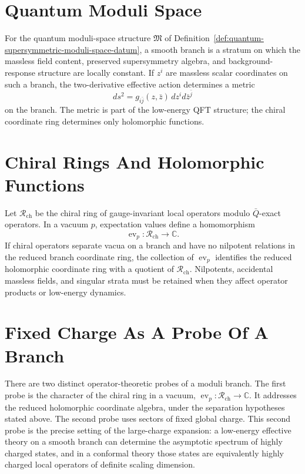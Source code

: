 \section{Quantum Moduli Space}

For the quantum moduli-space structure
\(\mathfrak M\) of
Definition~\ref{def:quantum-supersymmetric-moduli-space-datum}, a smooth
branch is a stratum on which the massless field content, preserved
supersymmetry algebra, and background-response structure are locally constant.
If \(z^i\) are massless scalar coordinates on such a branch, the
two-derivative effective action determines a metric
\[
  ds^2=g_{i\bar j}(z,\bar z)\,dz^i d\bar z^{\bar j}
\]
on the branch.  The metric is part of the low-energy QFT structure; the chiral
coordinate ring determines only holomorphic functions.

\section{Chiral Rings And Holomorphic Functions}

Let \(\mathcal R_{\mathrm{ch}}\) be the chiral ring of gauge-invariant local
operators modulo \(\bar Q\)-exact operators.  In a vacuum \(p\), expectation
values define a homomorphism
\[
  \operatorname{ev}_p:\mathcal R_{\mathrm{ch}}\longrightarrow\mathbb C .
\]
If chiral operators separate vacua on a branch and have no nilpotent
relations in the reduced branch coordinate ring, the collection of
\(\operatorname{ev}_p\) identifies the reduced holomorphic coordinate ring
with a quotient of \(\mathcal R_{\mathrm{ch}}\).  Nilpotents, accidental
massless fields, and singular strata must be retained when they affect
operator products or low-energy dynamics.

\section{Fixed Charge As A Probe Of A Branch}

There are two distinct operator-theoretic probes of a moduli branch.  The
first probe is the character of the chiral ring in a vacuum,
\(\operatorname{ev}_p:\mathcal R_{\mathrm{ch}}\to\mathbb C\).  It addresses
the reduced holomorphic coordinate algebra, under the separation hypotheses
stated above.  The second probe uses sectors of fixed global charge.  This
second probe is the precise setting of the large-charge expansion: a
low-energy effective theory on a smooth branch can determine the asymptotic
spectrum of highly charged states, and in a conformal theory those states
are equivalently highly charged local operators of definite scaling
dimension.

